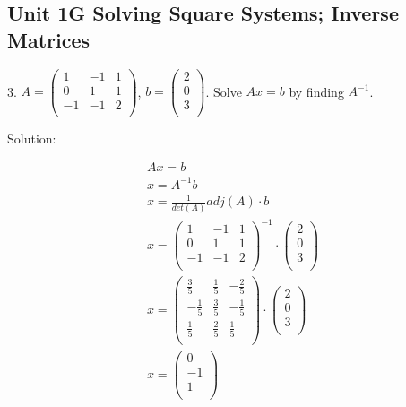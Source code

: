 \documentclass{article}
\begin{document}
\subsection*{Unit 1G Solving Square Systems; Inverse Matrices}

3. $A = \begin{pmatrix}
          1 & -1 & 1 \\
          0 & 1 & 1 \\
          -1 & -1 & 2 \\
        \end{pmatrix}$, $b = \begin{pmatrix}
                               2 \\
                               0 \\
                               3 \\ 
                             \end{pmatrix}$. Solve $Ax = b$ by finding $A^{-1}$.
                        
Solution:

\begin{gather*}
  Ax = b \\
  x = A^{-1}b \\
  x = \frac{1}{det(A)}adj(A) \cdot b \\
  x = \begin{pmatrix}
        1 & -1 & 1 \\
        0 & 1 & 1 \\
        -1 & -1 & 2 \\ 
      \end{pmatrix}^{-1} \cdot
      \begin{pmatrix}
        2 \\
        0 \\
        3 \\
      \end{pmatrix} \\
  x = \begin{pmatrix}
        \frac{3}{5} & \frac{1}{5} & -\frac{2}{5} \\
        -\frac{1}{5} & \frac{3}{5} & -\frac{1}{5} \\
        \frac{1}{5} & \frac{2}{5} & \frac{1}{5} \\ 
      \end{pmatrix} \cdot
      \begin{pmatrix}
        2 \\
        0 \\
        3 \\
      \end{pmatrix} \\
  x = \begin{pmatrix}
        0 \\
        -1 \\
        1 \\ 
      \end{pmatrix}
\end{gather*}
\end{document}
